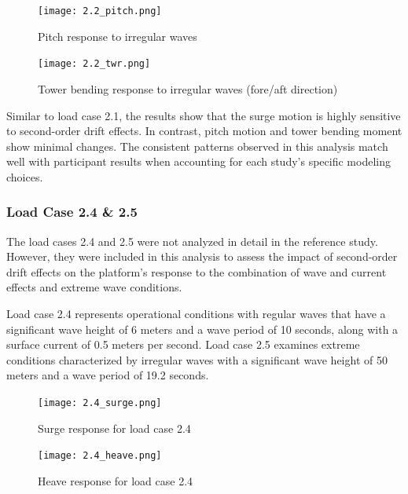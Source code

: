 \documentclass[a4paper, 11pt]{article}
\begin{document}
\begin{figure}[H]
    \centering
    \texttt{[image: 2.2\_pitch.png]}
    \caption{\small Pitch response to irregular waves}
    \label{fig:2.2_pitch}
\end{figure}

\begin{figure}[H]
    \centering
    \texttt{[image: 2.2\_twr.png]}
    \caption{\small Tower bending response to irregular waves (fore/aft direction)}
    \label{fig:2.2_twr}
\end{figure}

Similar to load case 2.1, the results show that the surge motion is highly sensitive to second-order drift effects. In contrast, pitch motion and tower bending moment show minimal changes. The consistent patterns observed in this analysis match well with participant results when accounting for each study's specific modeling choices.

\subsubsection{Load Case 2.4 \& 2.5}
\hspace{0.5cm}The load cases 2.4 and 2.5 were not analyzed in detail in the reference study. However, they were included in this analysis to assess the impact of second-order drift effects on the platform's response to the combination of wave and current effects and extreme wave conditions.

Load case 2.4 represents operational conditions with regular waves that have a significant wave height of 6 meters and a wave period of 10 seconds, along with a surface current of 0.5 meters per second. Load case 2.5 examines extreme conditions characterized by irregular waves with a significant wave height of 50 meters and a wave period of 19.2 seconds.

\begin{figure}[H]
    \begin{minipage}{0.49\textwidth}
        \centering
        \texttt{[image: 2.4\_surge.png]}
        \caption{\small Surge response for load case 2.4} 
        \label{fig:2.4_surge}
    \end{minipage}
    \hfill
    \begin{minipage}{0.49\textwidth}
        \centering
        \vspace{-0.3cm}
        \texttt{[image: 2.4\_heave.png]}
        \caption{\small Heave response for load case 2.4}
        \label{fig:2.4_heave}
    \end{minipage}
\end{figure}
\end{document}
